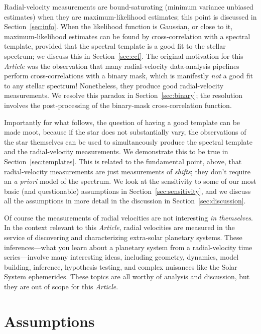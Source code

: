 \documentclass[modern]{aastex631}
\newcommand{\documentname}{\textsl{Article}}
\newcommand{\sectionname}{Section}
\newcommand{\secref}[1]{\sectionname~\ref{#1}}
\newcommand{\foreign}[1]{\textsl{#1}}
\begin{document}
Radial-velocity measurements are bound-saturating (minimum variance unbiased estimates) when they are maximum-likelihood estimates; this point is discussed in \secref{sec:info}.
When the likelihood function is Gaussian, or close to it, maximum-likelihood estimates can be found by cross-correlation with a spectral template, provided that the spectral template is a good fit to the stellar spectrum; we discuss this in \secref{sec:ccf}.
The original motivation for this \documentname{} was the observation that many radial-velocity data-analysis pipelines perform cross-correlations with a binary mask, which is manifestly \emph{not} a good fit to any stellar spectrum!
Nonetheless, they produce good radial-velocity measurements.
We resolve this paradox in \secref{sec:binary}; the resolution involves the post-processing of the binary-mask cross-correlation function.

Importantly for what follows, the question of having a good template can be made moot, because if the star does not substantially vary, the observations of the star themselves can be used to simultaneously produce the spectral template and the radial-velocity measurements.
We demonstrate this to be true in \secref{sec:templates}.
This is related to the fundamental point, above, that radial-velocity measurements are just measurements of \emph{shifts}; they don't require an \foreign{a priori} model of the spectrum.
We look at the sensitivity to some of our most basic (and questionable) assumptions in \secref{sec:sensitivity}, and we discuss all the assumptions in more detail in the discussion in \secref{sec:discussion}.

Of course the measurements of radial velocities are not interesting \emph{in themselves}.
In the context relevant to this \documentname, radial velocities are measured in the service of discovering and characterizing extra-solar planetary systems.
These inferences---what you learn about a planetary system from a radial-velocity time series---involve many interesting ideas, including geometry, dynamics, model building, inference, hypothesis testing, and complex nuisances like the Solar System ephemerides.
These topics are all worthy of analysis and discussion, but they are out of scope for this \documentname.

\section{Assumptions}\label{sec:assumptions}
\end{document}
